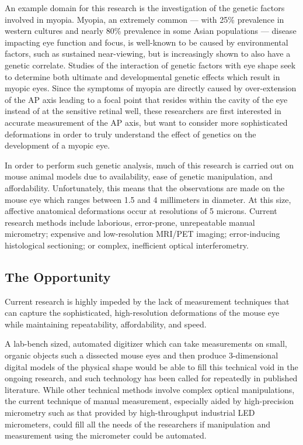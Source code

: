 \documentclass{article}
\begin{document}
An example domain for this research is the investigation of the genetic factors involved in myopia. Myopia, an extremely common --- with 25\% prevalence in western cultures and nearly 80\% prevalence in some Asian populations\cite{rajan98} --- disease impacting eye function and focus, is well-known to be caused by environmental factors, such as sustained near-viewing, but is increasingly shown to also have a genetic correlate.\cite{zhou99:genes,zhou99:models,schmucker04} Studies of the interaction of genetic factors with eye shape seek to determine both ultimate and developmental genetic effects which result in myopic eyes. Since the symptoms of myopia are directly caused by over-extension of the AP axis leading to a focal point that resides within the cavity of the eye instead of at the sensitive retinal well, these researchers are first interested in accurate measurement of the AP axis,\cite{wallman04} but want to consider more sophisticated deformations in order to truly understand the effect of genetics on the development of a myopic eye.\cite{schaeffel04}

In order to perform such genetic analysis, much of this research is carried out on mouse animal models due to availability, ease of genetic manipulation, and affordability.\cite{schaeffel04} Unfortunately, this means that the observations are made on the mouse eye which ranges between 1.5 and 4 millimeters in diameter. At this size, affective anatomical deformations occur at resolutions of 5 microns. Current research methods include laborious, error-prone, unrepeatable manual micrometry;\cite{wallman04} expensive and low-resolution MRI/PET imaging;\cite{atchison04} error-inducing histological sectioning;\cite{schaeffel04} or complex, inefficient optical interferometry.\cite{schaeffel04,guggenheim04}

\subsection{The Opportunity}
\label{sec:opportunity}

Current research is highly impeded by the lack of measurement
techniques that can capture the sophisticated, high-resolution
deformations of the mouse eye while
maintaining repeatability, affordability, and speed.

A lab-bench sized, automated digitizer which can take measurements on small, organic objects such a dissected mouse eyes and then produce 3-dimensional digital models of the physical shape would be able to fill this technical void in the ongoing research, and such technology has been called for repeatedly in published literature.\cite{schaeffel04,atchison04,zhou99:genes,zhou99:models} While other technical methods involve complex optical manipulations, the current technique of manual measurement, especially aided by high-precision micrometry such as that provided by high-throughput industrial LED micrometers, could fill all the needs of the researchers if manipulation and measurement using the micrometer could be automated.
\end{document}
